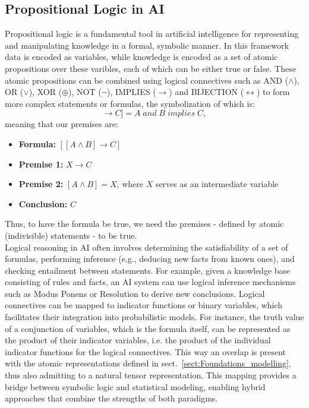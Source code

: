 \documentclass[encoding=utf8,british]{tumphthesis}
\begin{document}
        \subsection{Propositional Logic in AI}
        \label{subsect:Foundations_modelling_proplog}
            Propositional logic is a fundamental tool in artificial intelligence for representing and manipulating knowledge in a formal, symbolic manner. 
            In this framework data is encoded as variables, while knowledge is encoded as a set of atomic propositions over these varibles, each of which 
            can be either true or false. These atomic propositions can be combined using logical connectives such as AND ($\land$), OR ($\lor$), XOR ($\oplus$), 
            NOT ($\neg$), IMPLIES ($\rightarrow$) and BIJECTION ($\leftrightarrow$) to form more complex statements or formulas, the symbolization of which is:
            \begin{equation}
                [[A \land B] \rightarrow C] = A \; and \; B \; implies \; C,
                \label{eq:Logical_conn_ex}
            \end{equation}
            meaning that our premises are:
            \begin{itemize}
                \item \textbf{Formula:} $[[A \land B] \rightarrow C]$ 
                \item \textbf{Premise 1:} $X \rightarrow C$
                \item \textbf{Premise 2:} $[A \land B] = X$, where $X$ serves as an intermediate variable
                \item \textbf{Conclusion:} $C$
            \end{itemize}
            Thus, to have the formula be true, we need the premises - defined by atomic (indivisible) statements - to be true.
            \\
            Logical reasoning in AI often involves determining the satisfiability of a set of formulas, performing inference (e.g., deducing new facts from 
            known ones), and checking entailment between statements. For example, given a knowledge base consisting of rules and facts, an AI system can 
            use logical inference mechanisms such as Modus Ponens or Resolution to derive new conclusions.
            Logical connectives can be mapped to indicator functions or binary variables, which facilitates their integration into probabilistic 
            models. For instance, the truth value of a conjunction of variables, which is the formula itself, can be represented as the product of their indicator variables, 
            i.e. the product of the individual indicator functions for the logical connectives. 
            This way an overlap is present with the atomic representations defined in sect.~\ref{sect:Foundations_modelling}, thus also admitting to a natural tensor representation.
            This mapping provides a bridge between symbolic logic and statistical modeling, enabling hybrid approaches that combine the strengths of both paradigms.
\end{document}
